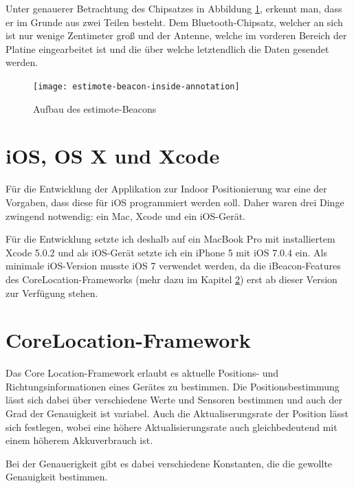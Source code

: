 Unter genauerer Betrachtung des Chipsatzes in Abbildung \ref{estimote-beacon-inside-annotations}, erkennt man, dass er im Grunde aus zwei Teilen besteht.
Dem Bluetooth-Chipsatz, welcher an sich ist nur wenige Zentimeter groß und der Antenne, welche im vorderen Bereich der Platine eingearbeitet ist und die über welche letztendlich die Daten gesendet werden.

\begin{figure}[h!]
	\centering
	\texttt{[image: estimote-beacon-inside-annotation]}
	\caption{Aufbau des estimote-Beacons}
	\label{estimote-beacon-inside-annotations}
\end{figure}



\section{iOS, OS X und Xcode}
\label{sec:technologies:iosandxcode}
Für die Entwicklung der Applikation zur Indoor Positionierung war eine der Vorgaben, dass diese für iOS programmiert werden soll.
Daher waren drei Dinge zwingend notwendig: ein Mac, Xcode und ein iOS-Gerät.

Für die Entwicklung setzte ich deshalb auf ein MacBook Pro mit installiertem Xcode 5.0.2 und als iOS-Gerät setzte ich ein iPhone 5 mit iOS 7.0.4 ein.
Als minimale iOS-Version musste iOS 7 verwendet werden, da die iBeacon-Features des CoreLocation-Frameworks (mehr dazu im Kapitel \ref{sec:technologies:corelocation}) erst ab dieser Version zur Verfügung stehen.


\section{CoreLocation-Framework}
\label{sec:technologies:corelocation}
Das Core Location-Framework erlaubt es aktuelle Positions- und Richtungsinformationen eines Gerätes zu bestimmen.
Die Positionsbestimmung lässt sich dabei über verschiedene Werte und Sensoren bestimmen und auch der Grad der Genauigkeit ist variabel.
Auch die Aktualiserungsrate der Position lässt sich festlegen, wobei eine höhere Aktualisierungsrate auch gleichbedeutend mit einem höherem Akkuverbrauch ist.

Bei der Genauerigkeit gibt es dabei verschiedene Konstanten, die die gewollte Genauigkeit bestimmen. 


